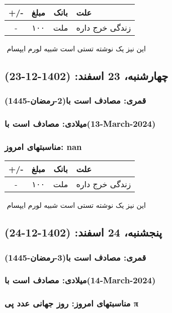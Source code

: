 \documentclass{article}
\newcommand{\rnote}[1]{\marginpar{\textcolor{color}{\StrSubstitute{\##1}{ }{\_}}}}
\newcommand{\myRow}[4]{
    #1 & #2 & #3 & #4 \\ \hline
}
\begin{document}
\begin{tabular}{ | c | c | c | p{5cm} |}
    \hline
    \myRow{ +/- }{مبلغ}{بانک}{علت}
    \myRow{-}{۱۰۰}{ملت}{زندگی خرج داره}
\end{tabular}
\newline
\newline

‌
\rnote{تست}
این نیز یک نوشته تستی است شبیه لورم ایپسام




\newpage
{}
\textcolor{color}{
\section{ چهارشنبه، 23 اسفند: (1402-12-23) }
\subsubsection*{قمری: مصادف است با(2-رمضان-1445)} 
\subsubsection*{میلادی: مصادف است با(13-March-2024)}
\subsubsection*{مناسبتهای امروز: nan}
}


\begin{tabular}{ | c | c | c | p{5cm} |}
    \hline
    \myRow{ +/- }{مبلغ}{بانک}{علت}
    \myRow{-}{۱۰۰}{ملت}{زندگی خرج داره}
\end{tabular}
\newline
\newline

‌
\rnote{تست}
این نیز یک نوشته تستی است شبیه لورم ایپسام




\newpage
{}
\textcolor{color}{
\section{ پنجشنبه، 24 اسفند: (1402-12-24) }
\subsubsection*{قمری: مصادف است با(3-رمضان-1445)} 
\subsubsection*{میلادی: مصادف است با(14-March-2024)}
\subsubsection*{مناسبتهای امروز: روز جهانی عدد پی π}
}
\end{document}
